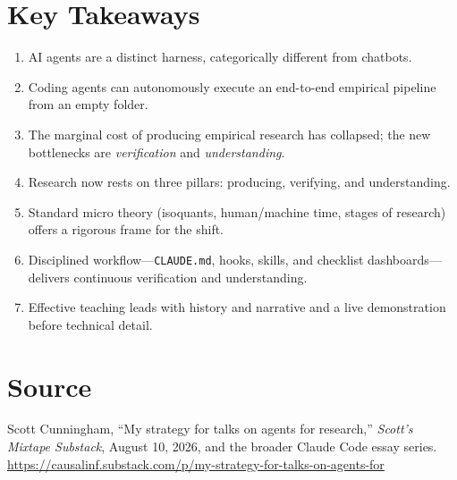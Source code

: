 \documentclass[11pt]{article}
\begin{document}
\section{Key Takeaways}
\begin{enumerate}[label=\textbf{\arabic*.}]
  \item AI agents are a distinct harness, categorically different from chatbots.
  \item Coding agents can autonomously execute an end-to-end empirical pipeline from an empty folder.
  \item The marginal cost of producing empirical research has collapsed; the new bottlenecks are \emph{verification} and \emph{understanding}.
  \item Research now rests on three pillars: producing, verifying, and understanding.
  \item Standard micro theory (isoquants, human/machine time, stages of research) offers a rigorous frame for the shift.
  \item Disciplined workflow---\texttt{CLAUDE.md}, hooks, skills, and checklist dashboards---delivers continuous verification and understanding.
  \item Effective teaching leads with history and narrative and a live demonstration before technical detail.
\end{enumerate}

\section*{Source}
Scott Cunningham, ``My strategy for talks on agents for research,''
\emph{Scott's Mixtape Substack}, August 10, 2026, and the broader Claude Code
essay series. \url{https://causalinf.substack.com/p/my-strategy-for-talks-on-agents-for}
\end{document}
